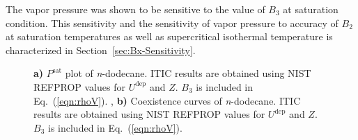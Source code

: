 \documentclass[5p,times]{elsarticle}
\begin{document}
The vapor pressure was shown to be sensitive to the value of $B_3$ at saturation condition. This sensitivity and the sensitivity of vapor pressure to accuracy of $B_2$ at saturation temperatures as well as supercritical isothermal temperature is characterized in Section~\ref{sec:Bx-Sensitivity}.

\begin{figure}
\centering
{}
\caption{
\textbf{a)} $P^{\mathrm{sat}}$ plot of \textit{n}-dodecane. ITIC results are obtained using NIST REFPROP values \cite{Lemmon2004} for $U^{\mathrm{dep}}$ and $Z$. $B_3$ is included in Eq.~(\ref{eqn:rhoV}).
, \textbf{b)} Coexistence curves of \textit{n}-dodecane. ITIC results are obtained using NIST REFPROP values \cite{Lemmon2004} for $U^{\mathrm{dep}}$ and $Z$. $B_3$ is included in Eq.~(\ref{eqn:rhoV}).
}
\label{fig:NIST-VALIDATION_C12_FTT}
\end{figure}
\end{document}
